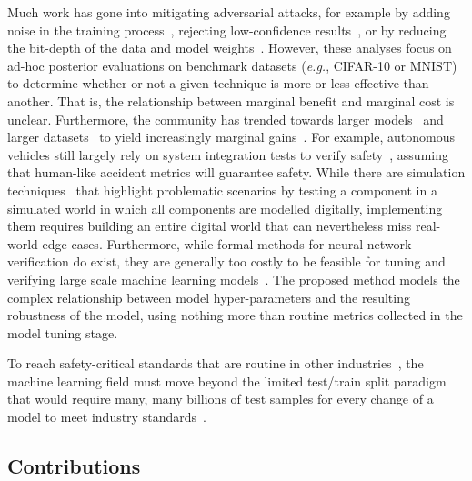 Much work has gone into mitigating adversarial attacks, for example by adding noise in the training process~\cite{gauss_aug,gauss_out}, rejecting low-confidence results~\cite{high_conf}, or by reducing the bit-depth of the data and model weights~\cite{feature_squeezing}. However, these analyses focus on ad-hoc posterior evaluations on benchmark datasets (\textit{e.g.}, CIFAR-10 or MNIST) to determine whether or not a given technique is more or less effective than another. That is, the relationship between marginal benefit and marginal cost is unclear. Furthermore, the community has trended towards larger models~\cite{desislavov2021compute} and larger datasets~\cite{desislavov2021compute,bailly2022effects} to yield increasingly marginal gains~\cite{sun2017revisiting}. For example, autonomous vehicles still largely rely on system integration tests to verify safety~\cite{vehicle_testing_review}, assuming that human-like accident metrics will guarantee safety. While there are simulation techniques~\cite{vehicle_formal} that highlight problematic scenarios by testing a component in a simulated world in which all components are modelled digitally, implementing them requires building an entire digital world that can nevertheless miss real-world edge cases. Furthermore, while formal methods for neural network verification do exist, they are generally too costly to be feasible for tuning and verifying large scale machine learning models~\cite{formal_adversarial}. The proposed method models the complex relationship between model hyper-parameters and the resulting robustness of the model, using nothing more than routine metrics collected in the model tuning stage.

To reach safety-critical standards that are routine in other industries~\cite{iso26262,IEC61508,IEC62034}, the machine learning field must move beyond the limited test/train split paradigm that would require many, many billions of test samples for every change of a model to meet industry standards~\cite{meyers}.


\subsection{Contributions}

